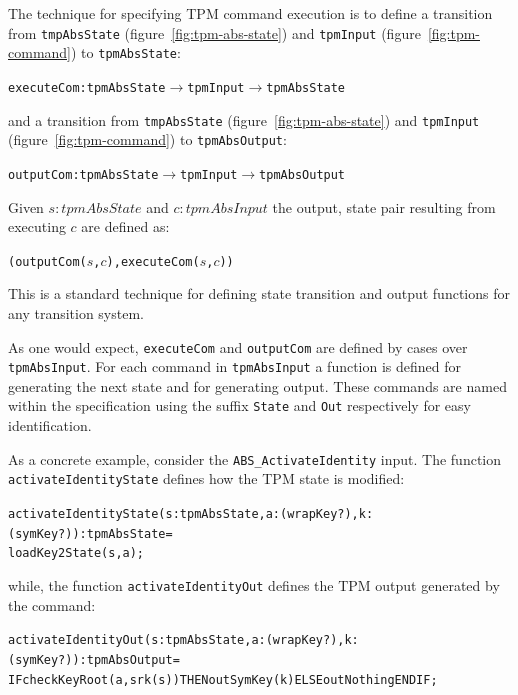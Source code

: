 \documentclass[10pt]{article}
\begin{document}
The technique for specifying TPM command execution is to define a
transition from \verb+tmpAbsState+ (figure~\ref{fig:tpm-abs-state})
and \verb+tpmInput+ (figure~\ref{fig:tpm-command}) to
\verb+tpmAbsState+:

\begin{alltt}
  executeCom : tpmAbsState \(\rightarrow\) tpmInput \(\rightarrow\) tpmAbsState
\end{alltt}

\noindent and a transition from \verb+tmpAbsState+
(figure~\ref{fig:tpm-abs-state}) and \verb+tpmInput+
(figure~\ref{fig:tpm-command}) to \verb+tpmAbsOutput+:

\begin{alltt}
  outputCom : tpmAbsState \(\rightarrow\) tpmInput \(\rightarrow\) tpmAbsOutput
\end{alltt}

Given $s:tpmAbsState$ and $c:tpmAbsInput$ the output, state pair
resulting from executing $c$ are defined as:

\begin{alltt}
  (outputCom(\(s\),\(c\)),executeCom(\(s\),\(c\)))
\end{alltt}

This is a standard technique for defining state transition and output
functions for any transition system.

As one would expect, \verb!executeCom! and \verb!outputCom! are
defined by cases over \verb!tpmAbsInput!.  For each command in
\verb!tpmAbsInput! a function is defined for generating the next state
and for generating output.  These commands are named within the
specification using the suffix \verb!State! and \verb!Out!
respectively for easy identification.

As a concrete example, consider the \verb!ABS_ActivateIdentity!
input.  The function \verb!activateIdentityState! defines how the TPM
state is modified:

\begin{alltt}
    activateIdentityState(s:tpmAbsState,a:(wrapKey?),k:(symKey?)) : tpmAbsState =
    loadKey2State(s,a);
\end{alltt}

\noindent while, the function \verb!activateIdentityOut! defines
the TPM output generated by the command:

\begin{alltt}
  activateIdentityOut(s:tpmAbsState,a:(wrapKey?),k:(symKey?)) : tpmAbsOutput =
    IF checkKeyRoot(a,srk(s)) THEN outSymKey(k) ELSE outNothing ENDIF;
\end{alltt}
\end{document}
